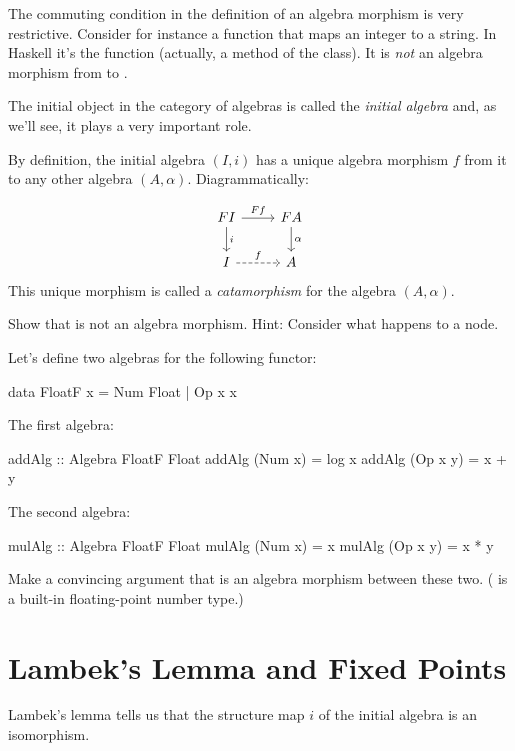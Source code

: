 \documentclass[DaoFP]{subfiles}
\begin{document}
The commuting condition in the definition of an algebra morphism is very restrictive. Consider for instance a function that maps an integer to a string. In Haskell it's the  function (actually, a method of the  class). It is \emph{not} an algebra morphism from  to . 

The initial object in the category of algebras is called the \emph{initial algebra} and, as we'll see, it plays a very important role.

By definition, the initial algebra $(I, i)$ has a unique algebra morphism $f$ from it to any other algebra $(A, \alpha)$. Diagrammatically:

\[
 \begin{tikzcd}
 F I 
 \arrow[r, "F f"]
 \arrow[d, "i"]
 & F A
\arrow[d, "\alpha"]
 \\
 I
 \arrow[r, dashed, "f"]
 & A
  \end{tikzcd}
\]
 This unique morphism is called a \emph{catamorphism} for the algebra $(A, \alpha)$.

\begin{exercise}
Show that  is not an algebra morphism. Hint: Consider what happens to a  node.
\end{exercise}

\begin{exercise}
Let's define two algebras for the following functor:
\begin{haskell}
data FloatF x = Num Float | Op x x
\end{haskell}
The first algebra:
\begin{haskell}
addAlg :: Algebra FloatF Float
addAlg (Num x) = log x
addAlg (Op x y) = x + y
\end{haskell}
The second algebra:
\begin{haskell}
mulAlg :: Algebra FloatF Float
mulAlg (Num x) = x
mulAlg (Op x y) = x * y
\end{haskell}
Make a convincing argument that  is an algebra morphism between these two. ( is a built-in floating-point number type.)
\end{exercise}

\section{Lambek's Lemma and Fixed Points}


Lambek's lemma tells us that the structure map $i$ of the initial algebra is an isomorphism. 
\end{document}
